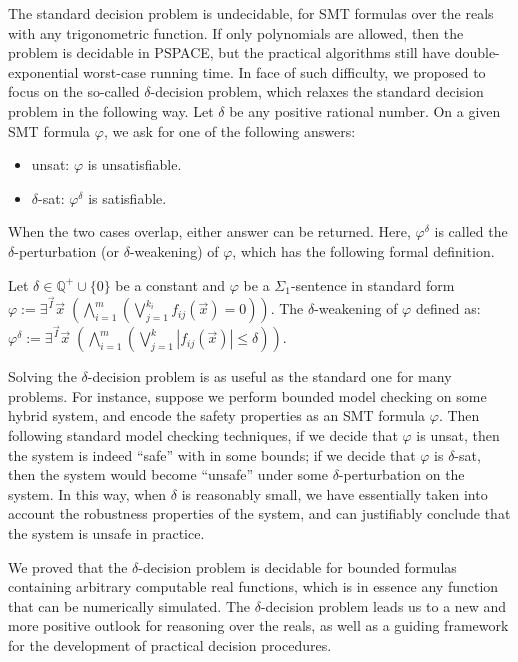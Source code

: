 \documentclass[envcountsect]{llncs}
\begin{document}
The standard decision problem is undecidable, for SMT formulas
over the reals with any trigonometric function. If only polynomials are allowed,
then the problem is decidable in {\sf PSPACE}, but the practical algorithms
still have
double-exponential worst-case running time. In face of such difficulty, we
proposed to focus on the so-called $\delta$-decision problem, which relaxes the
standard decision problem in the following way. Let $\delta$ be any positive
rational number. On a given SMT formula $\varphi$, we ask for one of the
following answers:
\begin{itemize}
 \item {\sf unsat}: $\varphi$ is unsatisfiable.
 \item {\sf $\delta$-sat}: $\varphi^{\delta}$ is satisfiable.
\end{itemize}
When the two cases overlap, either answer can be returned. Here,
$\varphi^{\delta}$ is called the $\delta$-perturbation (or $\delta$-weakening)
of $\varphi$, which has the following formal definition.
\begin{definition}
 Let $\delta\in \mathbb{Q}^+\cup\{0\}$ be a constant and $\varphi$ be a
$\Sigma_1$-sentence in standard form $\varphi:= \exists^{\vec I}\vec
x\;(\bigwedge_{i=1}^m (\bigvee_{j=1}^{k_i}
f_{ij}(\vec x)= 0))$. The $\delta$-weakening of $\varphi$ defined as:
$\varphi^{\delta}:= \exists^{\vec I} \vec x\;(\bigwedge_{i=1}^m(\bigvee_{j=1}^k
|f_{ij}(\vec x)|\leq \delta)).$
\end{definition}
Solving the $\delta$-decision problem is as useful as the standard one for many
problems. For instance, suppose we perform bounded
model checking on some hybrid system, and encode the safety properties as an SMT
formula $\varphi$. Then following standard model checking techniques, if we
decide that $\varphi$ is {\sf unsat}, then the system is indeed ``safe'' with in
some bounds; if we decide that $\varphi$ is {\sf $\delta$-sat}, then the system
would become ``unsafe'' under some $\delta$-perturbation on the system. In this
way, when $\delta$ is reasonably small, we have essentially taken into account
the robustness properties of the system, and can justifiably conclude that the
system is unsafe in practice.

We proved that the $\delta$-decision problem is decidable for bounded formulas
containing arbitrary computable real functions, which is in essence any
function that can be numerically simulated. The $\delta$-decision problem leads
us to a new and more positive outlook for reasoning over the reals, as well
as a guiding framework for the development of practical decision procedures.
\end{document}
